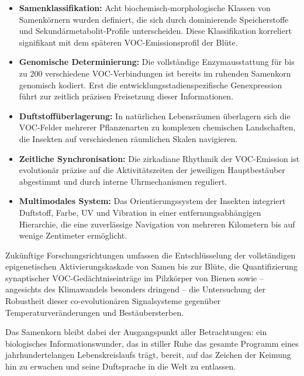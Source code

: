 ﻿\documentclass[12pt,a4paper]{article}
\begin{document}
\begin{itemize}
  \item \textbf{Samenklassifikation:} Acht biochemisch-morphologische Klassen von Samenk\"ornern wurden definiert, die sich durch dominierende Speicherstoffe und Sekund\"armetabolit-Profile unterscheiden. Diese Klassifikation korreliert signifikant mit dem sp\"ateren VOC-Emissionsprofil der Bl\"ute.
  \item \textbf{Genomische Determinierung:} Die vollst\"andige Enzymausstattung f\"ur bis zu 200 verschiedene VOC-Verbindungen ist bereits im ruhenden Samenkorn genomisch kodiert. Erst die entwicklungsstadienspezifische Genexpression f\"uhrt zur zeitlich pr\"azisen Freisetzung dieser Informationen.
  \item \textbf{Duftstoff\"uberlagerung:} In nat\"urlichen Lebensr\"aumen \"uberlagern sich die VOC-Felder mehrerer Pflanzenarten zu komplexen chemischen Landschaften, die Insekten auf verschiedenen r\"aumlichen Skalen navigieren.
  \item \textbf{Zeitliche Synchronisation:} Die zirkadiane Rhythmik der VOC-Emission ist evolution\"ar pr\"azise auf die Aktivit\"atszeiten der jeweiligen Hauptbest\"auber abgestimmt und durch interne Uhrmechanismen reguliert.
  \item \textbf{Multimodales System:} Das Orientierungssystem der Insekten integriert Duftstoff, Farbe, UV und Vibration in einer entfernungsabh\"angigen Hierarchie, die eine zuverl\"assige Navigation von mehreren Kilometern bis auf wenige Zentimeter erm\"oglicht.
\end{itemize}

Zuk\"unftige Forschungsrichtungen umfassen die Entschl\"usselung der vollst\"andigen epigenetischen Aktivierungskaskade von Samen bis zur Bl\"ute, die Quantifizierung synaptischer VOC-Ged\"achtniseintr\"age im Pilzk\"orper von Bienen sowie -- angesichts des Klimawandels besonders dringend -- die Untersuchung der Robustheit dieser co-evolution\"aren Signalsysteme gegen\"uber Temperaturver\"anderungen und Best\"aubersterben.

Das Samenkorn bleibt dabei der Ausgangspunkt aller Betrachtungen: ein biologisches Informationswunder, das in stiller Ruhe das gesamte Programm eines jahrhundertelangen Lebenskreislaufs tr\"agt, bereit, auf das Zeichen der Keimung hin zu erwachen und seine Duftsprache in die Welt zu entlassen.
\end{document}

